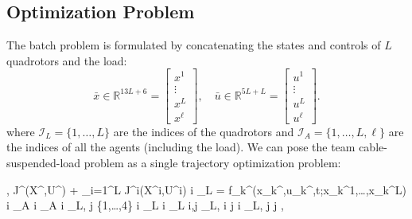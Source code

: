 \documentclass[../root.tex]{subfiles}
\begin{document}
\subsection{Optimization Problem} \label{sec:batch_problem}
The batch problem is formulated by concatenating the states and controls of
$L$ quadrotors and the load:
\begin{equation}
\bar{x} \in \mathbb{R}^{13L+6}= \begin{bmatrix} x^1 \\ \vdots \\ x^L \\ x^\ell \end{bmatrix}, \quad
\bar{u} \in \mathbb{R}^{5L+L} = \begin{bmatrix} u^1 \\  \vdots \\ u^L \\ u^\ell \end{bmatrix}.
\end{equation}
where $\mathcal{I}_L = \{1,\dots,L\}$ are the indices of the quadrotors and
$\mathcal{I}_A = \{1,\dots,L,\ell\}$ are the indices of all the agents
(including the load). We can pose the team cable-suspended-load problem as a
single trajectory optimization problem:
\begin{mini!}[3]
	{,}{ J^{\ell}(X^\ell,U^\ell) + \sum_{i=1}^L J^i(X^i,U^i) }{}{} \label{opt:quad_lift}
	{\forall i \in {}_L}
	\label{con:dynamics}
	{= f_k^{\ell}(x_k^\ell,u_k^\ell,\Delta t;x_k^1,\dots,x_k^L)}
	\label{con:load_dynamics}
	{\forall i \in {}_A}
	\label{con:initial_conditions}
	\label{con:final_conditions}
	{\forall i \in {}_A}
	\label{con:workspace}
	{\forall i \in {}_L, j \in \{1,\dots,4\}}
	\label{con:max_thrust}
	 \label{con:taut}
	{\forall i \in {}_L}
	\label{con:equal_force}
	{\forall i \in {}_L}
	\label{con:length}
	{\forall i,j \in {}_L, i \neq j}
	\label{con:collision}
	{\forall i \in {}_L, \forall j}
	\label{con:quad_obs}
	{\forall j}
	\label{con:load_obs},
\end{mini!} 					
\end{document}
